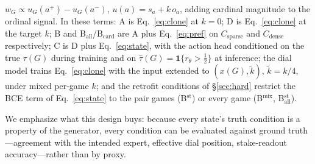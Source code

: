 \documentclass[manuscript, screen, review]{jair}
\begin{document}
$w_G \propto u_G(a^{+}) - u_G(a^{-})$, $u(a) = s_a + k\,o_a$, adding cardinal magnitude to
the ordinal signal. In these terms: A is Eq.~\eqref{eq:clone} at $k{=}0$; D is
Eq.~\eqref{eq:clone} at the target $k$; B and B$_{\mathrm{all}}$/B$_{\mathrm{card}}$ are A plus
Eq.~\eqref{eq:pref} on $C_{\mathrm{sparse}}$ and $C_{\mathrm{dense}}$ respectively; C is
D plus Eq.~\eqref{eq:state}, with the action head conditioned on the true $\tau(G)$ during
training and on $\hat{\tau}(G) = \mathbf{1}\{r_\theta > \tfrac12\}$ at inference; the dial
model trains Eq.~\eqref{eq:clone} with the input extended to $(x(G), \tilde{k})$,
$\tilde{k} = k/4$, under mixed per-game $k$; and the retrofit conditions of \S\ref{sec:hard}
restrict the BCE term of Eq.~\eqref{eq:state} to the pair games (B$^{\mathrm{st}}$) or every
game (B$^{\mathrm{mix}}$, B$_{\mathrm{all}}^{\mathrm{st}}$).

We emphasize what this design buys: because every state's truth condition is a property of the
generator, every condition can be evaluated against ground truth---agreement with the intended
expert, effective dial position, stake-readout accuracy---rather than by proxy.
\end{document}
